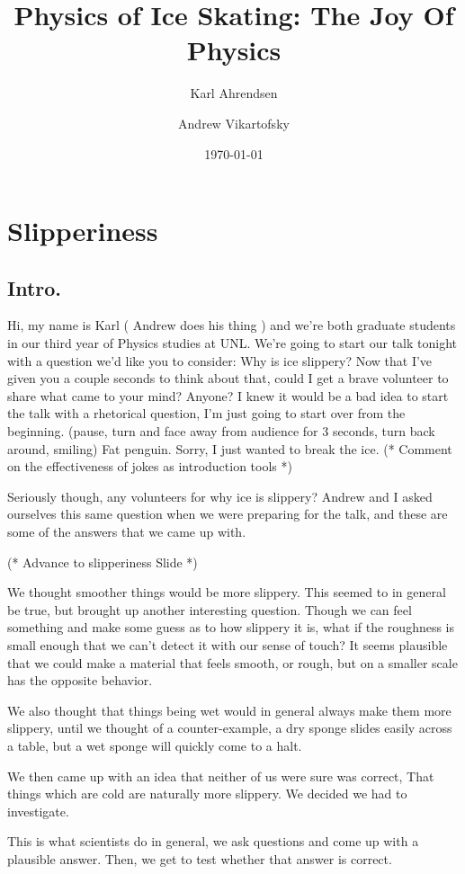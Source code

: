 \documentclass[12pt]{article}
\title{Physics of Ice Skating: The Joy Of Physics}
\author{Karl Ahrendsen \and Andrew Vikartofsky}
\date{\today}
\begin{document}
\maketitle
\section{Slipperiness}
\subsection{Intro.}
Hi, my name is Karl ( Andrew does his thing ) and we're both graduate
students in our third year of Physics studies at UNL. 
We're going to start our talk tonight with a question we'd like you to consider:
Why is ice slippery? Now that I've given you a couple seconds to think about that, 
could I get a brave volunteer to share what came to your mind? Anyone? I knew it would
be a bad idea to start the talk with a rhetorical question, I'm just going to start 
over from the beginning. (pause, turn and face away from audience for 3 seconds, 
turn back around, smiling) Fat penguin. Sorry, I just wanted to break the ice. 
(* Comment on the effectiveness of jokes as introduction tools *)
    
Seriously
though, any volunteers for why ice is slippery? Andrew and I asked ourselves
this same question when we were preparing for the talk, and these
are some of the answers that we came up with. 

(* Advance to slipperiness Slide *)

We thought smoother things
would be more slippery. This seemed to in general be true, but brought up
another interesting question. Though we can feel something and make some
guess as to how slippery it is, what if the roughness is small enough that we 
can't detect it with our sense of touch? It seems plausible that we could make a 
material that feels smooth, or rough, but on a smaller scale has the opposite 
behavior. 

We also thought that things being wet would in general always make them more 
slippery, until we thought of a counter-example, a dry sponge slides easily
across a table, but a wet sponge will quickly come to a halt.

We then came up with an idea that neither of us were sure was correct,
That things which are cold are naturally more slippery. We decided we had
to investigate. 

This is what scientists do in general, we ask questions and come up with a 
plausible answer. Then, we get to test whether that answer is correct. 
\end{document}

